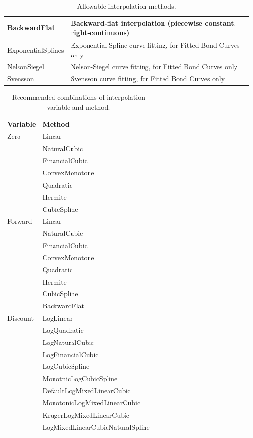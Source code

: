 \begin{table}[H]
\begin{tabular}{|l|p{9cm}|}
    BackwardFlat & Backward-flat interpolation (piecewise constant, right-continuous) \\ \hline
    ExponentialSplines & Exponential Spline curve fitting, for Fitted Bond Curves only \\ \hline
    NelsonSiegel & Nelson-Siegel curve fitting, for Fitted Bond Curves only \\ \hline
    Svensson & Svensson curve fitting, for Fitted Bond Curves only \\ \hline
  \end{tabular}
  \caption{Allowable interpolation methods.}
  \label{tab:allow_interp_methods}
\end{table}

\begin{table}[H]
\centering
\begin{tabular}{|l|l|}
    \hline
    {\bfseries Variable} & {\bfseries Method} \\
    \hline
    Zero        & Linear \\
                & NaturalCubic \\
                & FinancialCubic \\
                & ConvexMonotone \\
                & Quadratic \\
                & Hermite \\
                & CubicSpline \\ \hline
    Forward     & Linear \\
                & NaturalCubic \\
                & FinancialCubic \\
                & ConvexMonotone \\
                & Quadratic \\
                & Hermite \\
                & CubicSpline \\
                & BackwardFlat \\ \hline
    Discount    & LogLinear \\
                & LogQuadratic \\
                & LogNaturalCubic \\
                & LogFinancialCubic \\
                & LogCubicSpline \\
                & MonotnicLogCubicSpline \\
                & DefaultLogMixedLinearCubic \\
                & MonotonicLogMixedLinearCubic \\
                & KrugerLogMixedLinearCubic \\
                & LogMixedLinearCubicNaturalSpline \\ \hline
  \end{tabular}
  \caption{Recommended combinations of interpolation variable and method.}
  \label{tab:recommende_interp_var_methods}
\end{table}

